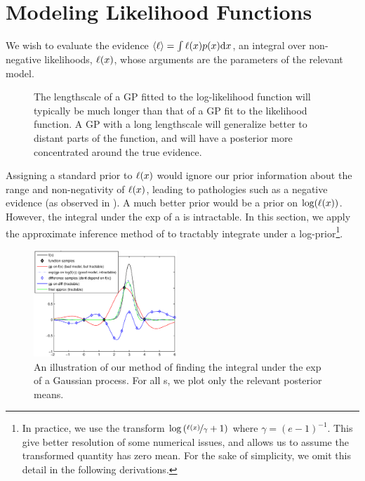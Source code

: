 \documentclass{article}
\begin{document}
\section{Modeling Likelihood Functions}

We wish to evaluate the evidence $\inty{\lfn} = \int \lfn(\lfv) p(\lfv) \ud\lfv$, an integral over non-negative likelihoods, $\lfn(\lfv)$, whose arguments are the parameters of the relevant model.


\begin{figure}
\centering
\caption{The lengthscale of a GP fitted to the log-likelihood function will typically be much longer than that of a GP fit to the likelihood function.  A GP with a long lengthscale will generalize better to distant parts of the function, and will have a posterior more concentrated around the true evidence. }
\label{fig:log_is_better}
\end{figure}

Assigning a standard \gpb prior to $\lfn(\lfv)$ would ignore our prior information about the range and non-negativity of $\lfn(\lfv)$, leading to pathologies such as a negative evidence (as observed in \citet{BZMonteCarlo}).  A much better prior would be a \gpb prior on $\log(\lfn(x))$.  However, the integral under the exp of a \gpb is intractable.  In this section, we apply the approximate inference method of \citep{BQR} to tractably integrate under a log-\gpb prior\footnote{In practice, we use the transform 
$\log\left(\nicefrac{\lfn(\lfv)}{\gamma} + 1\right)$
where $\gamma = (e-1)^{-1}$.  This give better resolution of some numerical issues, and allows us to assume the transformed quantity has zero mean. For the sake of simplicity, we omit this detail in the following derivations.}.

\begin{figure}
\centering
\includegraphics[width=0.48\textwidth]{figures/log_gp_diff.eps}
\caption{An illustration of our method of finding the integral under the exp of a Gaussian process. For all \gp s, we plot only the relevant posterior means.}
\label{fig:integrate_hypers}
\end{figure}
\end{document}
